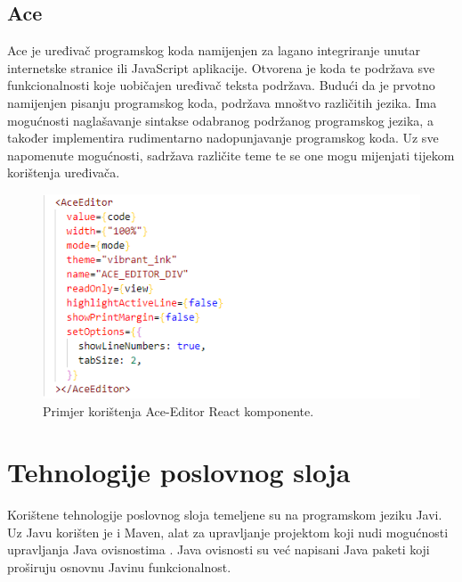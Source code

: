 \documentclass[times, utf8, zavrsni, numeric]{fer}
\begin{document}
			\subsection{Ace}
			Ace\cite{ace2021} je uređivač programskog koda namijenjen za lagano integriranje unutar internetske stranice ili JavaScript aplikacije. Otvorena je koda te podržava sve funkcionalnosti koje uobičajen uređivač teksta podržava. Budući da je prvotno namijenjen pisanju programskog koda, podržava mnoštvo različitih jezika. Ima mogućnosti naglašavanje sintakse odabranog podržanog programskog jezika, a također implementira rudimentarno nadopunjavanje programskog koda. Uz sve napomenute mogućnosti, sadržava različite teme te se one mogu mijenjati tijekom korištenja uređivača.
			\begin{figure}[H]
				\centering
				\includegraphics[scale=0.75]{pictures/prikazi/AceEditor.png}
				\caption{Primjer korištenja Ace-Editor React komponente.}
				\label{fig:ace}
			\end{figure}
	
		\section{Tehnologije poslovnog sloja}
		Korištene tehnologije poslovnog sloja temeljene su na programskom jeziku Javi\cite{java2021}. Uz Javu korišten je i Maven\cite{maven2021}, alat za upravljanje projektom koji nudi mogućnosti upravljanja Java ovisnostima . Java ovisnosti su već napisani Java paketi koji proširuju osnovnu Javinu funkcionalnost.
\end{document}

